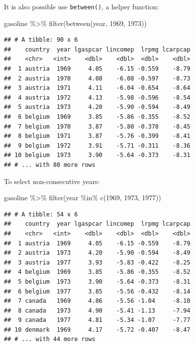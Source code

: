 \documentclass[
]{article}
\newenvironment{Shaded}{\begin{snugshade}}{\end{snugshade}}
\newcommand{\DecValTok}[1]{\textcolor[rgb]{0.00,0.00,0.81}{#1}}
\newcommand{\FunctionTok}[1]{\textcolor[rgb]{0.00,0.00,0.00}{#1}}
\newcommand{\NormalTok}[1]{#1}
\newcommand{\SpecialCharTok}[1]{\textcolor[rgb]{0.00,0.00,0.00}{#1}}
\begin{document}
It is also possible use \texttt{between()}, a helper function:

\begin{Shaded}
\begin{Highlighting}[]
\NormalTok{gasoline }\SpecialCharTok{\%\textgreater{}\%}
  \FunctionTok{filter}\NormalTok{(}\FunctionTok{between}\NormalTok{(year, }\DecValTok{1969}\NormalTok{, }\DecValTok{1973}\NormalTok{))}
\end{Highlighting}
\end{Shaded}

\begin{verbatim}
## # A tibble: 90 x 6
##    country  year lgaspcar lincomep  lrpmg lcarpcap
##    <chr>   <int>    <dbl>    <dbl>  <dbl>    <dbl>
##  1 austria  1969     4.05    -6.15 -0.559    -8.79
##  2 austria  1970     4.08    -6.08 -0.597    -8.73
##  3 austria  1971     4.11    -6.04 -0.654    -8.64
##  4 austria  1972     4.13    -5.98 -0.596    -8.54
##  5 austria  1973     4.20    -5.90 -0.594    -8.49
##  6 belgium  1969     3.85    -5.86 -0.355    -8.52
##  7 belgium  1970     3.87    -5.80 -0.378    -8.45
##  8 belgium  1971     3.87    -5.76 -0.399    -8.41
##  9 belgium  1972     3.91    -5.71 -0.311    -8.36
## 10 belgium  1973     3.90    -5.64 -0.373    -8.31
## # ... with 80 more rows
\end{verbatim}

To select non-consecutive years:

\begin{Shaded}
\begin{Highlighting}[]
\NormalTok{gasoline }\SpecialCharTok{\%\textgreater{}\%}
  \FunctionTok{filter}\NormalTok{(year }\SpecialCharTok{\%in\%} \FunctionTok{c}\NormalTok{(}\DecValTok{1969}\NormalTok{, }\DecValTok{1973}\NormalTok{, }\DecValTok{1977}\NormalTok{))}
\end{Highlighting}
\end{Shaded}

\begin{verbatim}
## # A tibble: 54 x 6
##    country  year lgaspcar lincomep  lrpmg lcarpcap
##    <chr>   <int>    <dbl>    <dbl>  <dbl>    <dbl>
##  1 austria  1969     4.05    -6.15 -0.559    -8.79
##  2 austria  1973     4.20    -5.90 -0.594    -8.49
##  3 austria  1977     3.93    -5.83 -0.422    -8.25
##  4 belgium  1969     3.85    -5.86 -0.355    -8.52
##  5 belgium  1973     3.90    -5.64 -0.373    -8.31
##  6 belgium  1977     3.85    -5.56 -0.432    -8.14
##  7 canada   1969     4.86    -5.56 -1.04     -8.10
##  8 canada   1973     4.90    -5.41 -1.13     -7.94
##  9 canada   1977     4.81    -5.34 -1.07     -7.77
## 10 denmark  1969     4.17    -5.72 -0.407    -8.47
## # ... with 44 more rows
\end{verbatim}
\end{document}
